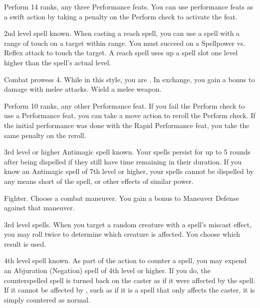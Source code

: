 \featpres Perform 14 ranks, any three Performance feats.
\featben You can use performance feats as a swift action by taking a  penalty on the Perform check to activate the feat.

\featpre 2nd level spell known.
\featben When casting a reach spell, you can use a spell with a range of touch on a target within \rngclose range.
You must succeed on a Spellpower vs. Reflex attack to touch the target.
A reach spell uses up a spell slot one level higher than the spell's actual level.

\featpre Combat prowess 4.
\featben While in this style, you are .
In exchange, you gain a  bonus to damage with melee attacks.
\stylereq Wield a melee weapon.

\featpres Perform 10 ranks, any other Performance feat.
\featben If you fail the Perform check to use a Performance feat, you can take a move action to reroll the Perform check.
If the initial performance was done with the Rapid Performance feat, you take the same  penalty on the reroll.

\featpre 3rd level or higher Antimagic spell known.
\featben Your spells persist for up to 5 rounds after being dispelled if they still have time remaining in their duration.
If you know an Antimagic spell of 7th level or higher, your spells cannot be dispelled by any means short of the  spell, or other effects of similar power.

\featpre Fighter.
\featben Choose a combat maneuver.
You gain a  bonus to Maneuver Defense against that maneuver.

\featpre 3rd level spells.
\featben When you target a random creature with a spell's miscast effect, you may roll twice to determine which creature is affected.
You choose which result is used.

\featpre 4th level spell known.
\featben As part of the action to counter a spell, you may expend an Abjuration (Negation) spell of 4th level or higher.
If you do, the counterspelled spell is turned back on the caster as if it were affected by the 
spell.
If it cannot be affected by , such as if it is a spell that only affects the caster, it is simply countered as normal.

